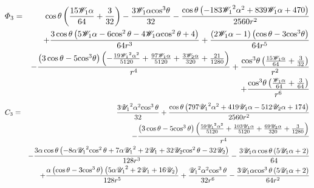 \begin{eqnarray*}
\varPhi_3 &=& \cos\theta \left(\frac{15 \mathscr{W}_1\alpha}{64} + \frac{3}{32}\right) - \frac{3 \mathscr{W}_1\alpha {\cos}^3\theta}{32} - \frac{\cos\theta \left( - 183 {\mathscr{W}_1}^2\alpha^2 + 839 \mathscr{W}_1\alpha + 470\right)}{2560 r^2} \\ 
&&+ \frac{3 \cos\theta \left(5 \mathscr{W}_1\alpha - 6 {\cos^2\theta} - 4 \mathscr{W}_1\alpha {\cos^2\theta} + 4\right)}{64 r^3} + \frac{\left(2 \mathscr{W}_1\alpha - 1\right) \left(\cos\theta - 3 {\cos}^3\theta\right)}{64 r^5} 
\\ 
&&- \frac{\left(3 \cos\theta - 5 {\cos}^3\theta\right) \left( - \frac{19 {\mathscr{W}_1}^2\alpha^2}{5120} + \frac{97 \mathscr{W}_1\alpha}{5120} + \frac{3 \mathscr{W}_2\alpha}{320} + \frac{21}{1280}\right)}{r^4} + \frac{{\cos}^3\theta \left(\frac{15 \mathscr{W}_1\alpha}{64} + \frac{3}{32}\right)}{r^2} \\ 
&&+ \frac{{\cos}^3\theta \left(\frac{\mathscr{W}_1\alpha}{64} + \frac{3}{64}\right)}{r^6}
\end{eqnarray*}
\begin{eqnarray*}
C_3 &=&
\frac{3 {{\mathscr{U}_1}}^2\alpha^2 {\cos^3\theta}}{32} + \frac{\cos\theta \left(797 {{\mathscr{U}_1}}^2\alpha^2 + 419 {\mathscr{U}_1}\alpha - 512 {\mathscr{U}_2}\alpha + 174\right)}{2560 r^2} \\
&&- \frac{\left(3 \cos\theta - 5 {\cos^3\theta}\right) \left(\frac{59 {{\mathscr{U}_1}}^2\alpha^2}{5120} + \frac{103 {\mathscr{U}_1}\alpha}{5120} + \frac{69 {\mathscr{U}_2}\alpha}{320} + \frac{3}{1280}\right)}{r^4} \\
&&- \frac{3\alpha \cos\theta \left( - 8\alpha {{\mathscr{U}_1}}^2 {\cos^2\theta} + 7\alpha {{\mathscr{U}_1}}^2 + 2 {\mathscr{U}_1} + 32 {\mathscr{U}_2} {\cos^2\theta} - 32 {\mathscr{U}_2}\right)}{128 r^3} - \frac{3 {\mathscr{U}_1}\alpha \cos\theta \left(5 {\mathscr{U}_1}\alpha + 2\right)}{64} \\
&&+ \frac{\alpha \left(\cos\theta - 3 {\cos^3\theta}\right) \left(5\alpha {{\mathscr{U}_1}}^2 + 2 {\mathscr{U}_1} + 16 {\mathscr{U}_2}\right)}{128 r^5} + \frac{{{\mathscr{U}_1}}^2\alpha^2 {\cos^3\theta}}{32 r^6} - \frac{3 {\mathscr{U}_1}\alpha {\cos^3\theta} \left(5 {\mathscr{U}_1}\alpha + 2\right)}{64 r^2}
\end{eqnarray*}

